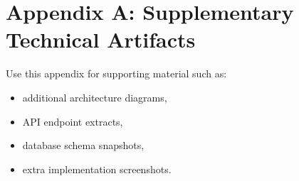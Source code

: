 \chapter{Appendix A: Supplementary Technical Artifacts}

Use this appendix for supporting material such as:
\begin{itemize}
	\item additional architecture diagrams,
	\item API endpoint extracts,
	\item database schema snapshots,
	\item extra implementation screenshots.
\end{itemize}
